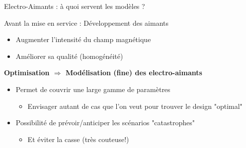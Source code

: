 \begin{frame}{Electro-Aimants : à quoi servent les modèles ?}
  \begin{block}{Avant la mise en service : Développement des aimants}
    \begin{small}
      \begin{itemize}
      \item Augmenter l'intensité du champ magnétique
      \item Améliorer sa qualité (homogénéité)
      \end{itemize}
    \end{small}
    \vspace*{-0.5cm}
    \begin{center} \textbf{Optimisation $\Rightarrow$ Modélisation (fine) des electro-aimants} \end{center}
    \vspace*{-0.3cm}
    \begin{small}
      \begin{itemize}
      \item Permet de couvrir une large gamme de paramètres
        \begin{itemize}
        \item Envisager autant de cas que l'on veut pour trouver le design "optimal"
        \end{itemize}
      \item Possibilité de prévoir/anticiper les scénarios "catastrophes"
        \begin{itemize}
        \item Et éviter la casse (très couteuse!)
        \end{itemize}
      \end{itemize}
    \end{small}
  \end{block}
\end{frame}

